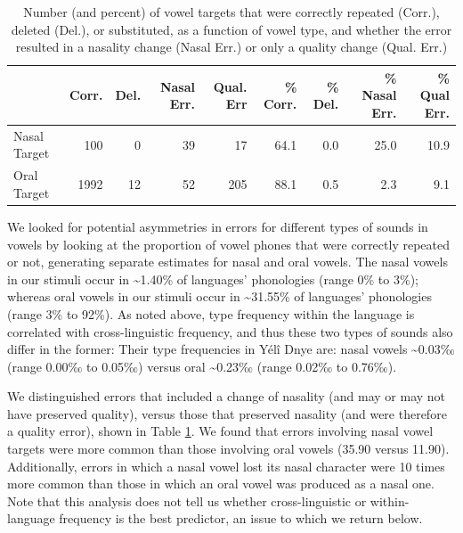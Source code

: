 \documentclass[english,,man,floatsintext]{apa6}
\begin{document}
\begin{table}

\caption{\label{tab:tab-v}Number (and percent) of vowel targets that were correctly repeated (Corr.), deleted (Del.), or substituted, as a function of vowel type, and whether the error resulted in a nasality change (Nasal Err.) or only a quality change (Qual. Err.)}
\centering
\begin{tabular}[t]{lrrrrrrrr}
\toprule
  & Corr. & Del. & Nasal Err. & Qual. Err & \% Corr. & \% Del. & \% Nasal Err. & \% Qual Err.\\
\midrule
Nasal Target & 100 & 0 & 39 & 17 & 64.1 & 0.0 & 25.0 & 10.9\\
Oral Target & 1992 & 12 & 52 & 205 & 88.1 & 0.5 & 2.3 & 9.1\\
\bottomrule
\end{tabular}
\end{table}

We looked for potential asymmetries in errors for different types of sounds in vowels by looking at the proportion of vowel phones that were correctly repeated or not, generating separate estimates for nasal and oral vowels. The nasal vowels in our stimuli occur in \textasciitilde{}1.40\% of languages' phonologies (range 0\% to 3\%);
whereas oral vowels in our stimuli occur in \textasciitilde{}31.55\% of languages' phonologies (range 3\% to 92\%).
As noted above, type frequency within the language is correlated with cross-linguistic frequency, and thus these two types of sounds also differ in the former: Their type frequencies in Yélî Dnye are: nasal vowels \textasciitilde{}0.03‰ (range 0.00‰ to 0.05‰) versus oral \textasciitilde{}0.23‰ (range 0.02‰ to 0.76‰).

We distinguished errors that included a change of nasality (and may or may not have preserved quality), versus those that preserved nasality (and were therefore a quality error), shown in Table \ref{tab:tab-v}. We found that errors involving nasal vowel targets were more common than those involving oral vowels (35.90 versus 11.90). Additionally, errors in which a nasal vowel lost its nasal character were 10 times more common than those in which an oral vowel was produced as a nasal one. Note that this analysis does not tell us whether cross-linguistic or within-language frequency is the best predictor, an issue to which we return below.
\end{document}
